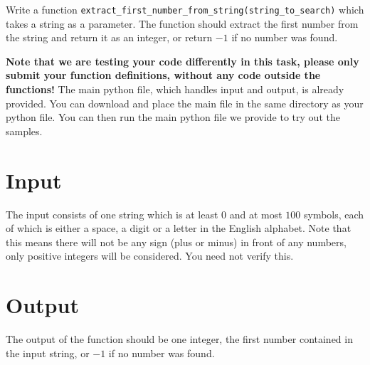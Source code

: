 
Write a function
\texttt{extract\_first\_number\_from\_string(string\_to\_search)}
which takes a string as a parameter.
The function should extract the first number from the string
and return it as an integer,
or return $-1$ if no number was found.

\textbf{Note that we are testing your code differently in this task,
please only submit your function definitions, without any code outside the functions!}
The main python file, which handles input and output, is already provided.
You can download and place the main file in the same directory as your python file.
You can then run the main python file we provide to try out the samples.

\section*{Input}
The input consists of one string which is at least $0$ and at most $100$ symbols,
each of which is either a space, a digit or a letter in the English alphabet.
Note that this means there will not be any sign (plus or minus) in front of any numbers,
only positive integers will be considered.
You need not verify this.

\section*{Output}
The output of the function should be one integer,
the first number contained in the input string,
or $-1$ if no number was found.
